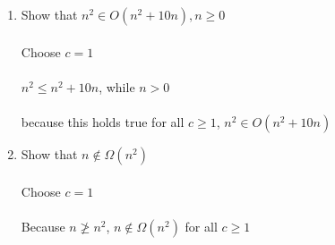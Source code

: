 \documentclass[12pt]{article}
\newcommand\tab[1][1cm]{\hspace*{#1}}
\begin{document}
\begin {enumerate}
\item Show that $n^{2} \in O(n^{2}+10n), n \geq 0$ \\ \\
	\tab Choose $c=1$ \\ \\
	\tab $n^{2} \leq n^{2} + 10n$, while $n>0$ \\ \\
	\tab because this holds true for all $c \geq 1$, $n^{2} \in O(n^{2}+10n)$
\item Show that $n \not\in \Omega(n^{2})$ \\ \\
	\tab Choose $c=1$ \\ \\
	\tab Because $n \not\geq n^{2}$, $n \not\in \Omega(n^{2})$ for all $c \geq 1$
\end {enumerate}
\end{document}
